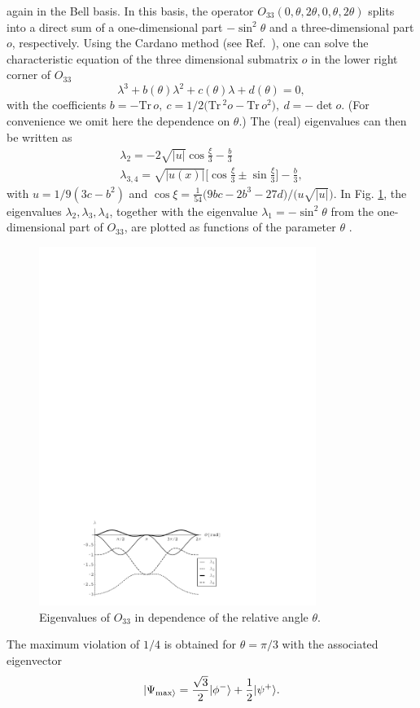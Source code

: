 \documentclass[prl,showpacs,showkeys,amsfonts,amsmath,twocolumn]{revtex4}
\begin{document}
again in the Bell basis.
In this basis, the operator $O_{33}(0,\theta,2\theta,0,\theta,2\theta)$
splits into a direct sum of a one-dimensional part $-\sin^2\theta $
and a three-dimensional part $o$, respectively. Using the Cardano method
(see Ref.~\cite{cocolicchio00}), one can
solve the characteristic equation of the three dimensional submatrix
$o$ in the lower right corner of $O_{33}$
\begin{equation}
  \lambda^3 + b(\theta) \lambda^2 + c(\theta) \lambda + d(\theta) = 0,
\label{2004-qbounds-characteristic}
\end{equation}
with the coefficients $b = -\text{Tr}\, o,\ c = 1/2\Big(\text{Tr}\,^2 o -
\text{Tr}\, o^2 \Big),\ d = -\det o$. (For convenience we omit here the
dependence on $\theta$.) The (real) eigenvalues can then be written as \cite{cocolicchio00}
\begin{eqnarray}
\lambda_2 = -2 \sqrt{|u|}\cos\frac{\xi}{3}-\frac{b}{3}\nonumber\\
\lambda_{3,4} = \sqrt{|u(x)|}\Big[\cos\frac{\xi}{3} \pm
\sin\frac{\xi}{3}\Big]-\frac{b}{3},
\label{2004-qbounds-o33ev}
\end{eqnarray}
with $u=1/9(3 c-b^2)$ and $\cos\xi = \frac{1}{54}\big(9 b c -2 b^3 - 27 d\big)/\big(u\sqrt{|u|}\big)$.
In Fig. \ref{fig:2004-qbounds-f1},
the eigenvalues $\lambda_2, \lambda_3, \lambda_4$,
together with the eigenvalue $\lambda_1 = -\sin^2\theta$ from the
one-dimensional part of $O_{33}$, are plotted  as functions of the parameter $\theta$ .
\begin{figure}[htbp]
  \centering
  \includegraphics[width=90mm]{2004-qbounds-f1}
  \caption{Eigenvalues of $O_{33}$ in dependence of the relative angle $\theta$.}
  \label{fig:2004-qbounds-f1}
\end{figure}
The maximum violation of $1/4$ is obtained for $\theta=\pi/3$ with the associated
eigenvector
\begin{equation}
  |\Psi_{\rm max \rangle}=\frac{\sqrt{3}}{2}|\phi^- \rangle+\frac{1}{2}|\psi^+ \rangle.
\label{2004-qbounds-pmax33}
\end{equation}
\end{document}
